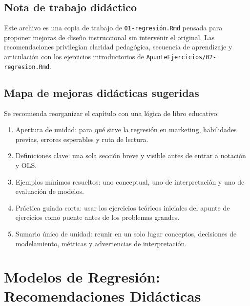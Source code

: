 \documentclass[
]{book}
\providecommand{\tightlist}{%
  \setlength{\itemsep}{0pt}\setlength{\parskip}{0pt}}
\begin{document}
\hypertarget{nota-de-trabajo-diduxe1ctico}{%
\section*{Nota de trabajo didáctico}\label{nota-de-trabajo-diduxe1ctico}}

Este archivo es una copia de trabajo de \texttt{01-regresión.Rmd} pensada para
proponer mejoras de diseño instruccional sin intervenir el original.
Las recomendaciones privilegian claridad pedagógica, secuencia de
aprendizaje y articulación con los ejercicios introductorios de
\texttt{ApunteEjercicios/02-regresion.Rmd}.

\hypertarget{mapa-de-mejoras-diduxe1cticas-sugeridas}{%
\section*{Mapa de mejoras didácticas sugeridas}\label{mapa-de-mejoras-diduxe1cticas-sugeridas}}

Se recomienda reorganizar el capítulo con una lógica de libro
educativo:

\begin{enumerate}
\def\labelenumi{\arabic{enumi}.}
\tightlist
\item
  Apertura de unidad: para qué sirve la regresión en marketing,
  habilidades previas, errores esperables y ruta de lectura.
\item
  Definiciones clave: una sola sección breve y visible antes de entrar
  a notación y OLS.
\item
  Ejemplos mínimos resueltos: uno conceptual, uno de interpretación y
  uno de evaluación de modelos.
\item
  Práctica guiada corta: usar los ejercicios teóricos iniciales del
  apunte de ejercicios como puente antes de los problemas grandes.
\item
  Sumario único de unidad: reunir en un solo lugar conceptos,
  decisiones de modelamiento, métricas y advertencias de
  interpretación.
\end{enumerate}

\hypertarget{modelos-de-regresiuxf3n-recomendaciones-diduxe1cticas}{%
\chapter{Modelos de Regresión: Recomendaciones Didácticas}\label{modelos-de-regresiuxf3n-recomendaciones-diduxe1cticas}}
\end{document}
